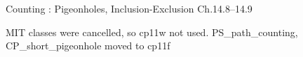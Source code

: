\documentclass[handout]{mcs}
\begin{document}
\begin{staffnotes}
Counting : Pigeonholes, Inclusion-Exclusion Ch.14.8--14.9
\end{staffnotes}

\begin{staffnotes}
MIT classes were cancelled, so cp11w not used.  PS_path_counting,
CP_short_pigeonhole moved to cp11f
\end{staffnotes}



\end{document}
